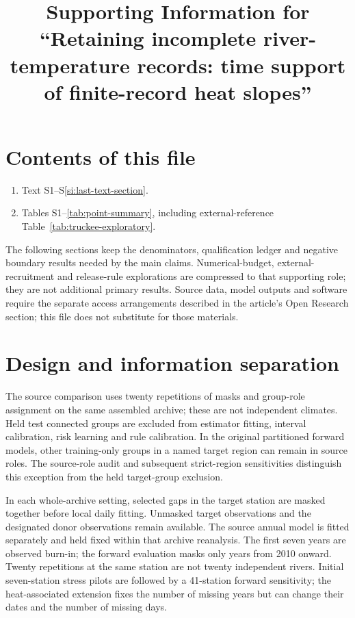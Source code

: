 \documentclass[draft,wrr]{agutexSI2019}
\begin{document}
\title{Supporting Information for ``Retaining incomplete river-temperature records: time support of finite-record heat slopes''}
\begin{article}
\makeatletter
\let\table\savetable
\let\endtable\saveendtable
\let\tabular\savetabular
\let\endtabular\saveendtabular
\let\caption\savecaption
\let\figure\savefigure
\let\endfigure\saveendfigure
\makeatother
\section*{Contents of this file}
\begin{enumerate}
\item Text S1--S\ref{si:last-text-section}.
\item Tables S1--\ref{tab:point-summary}, including external-reference Table~\ref{tab:truckee-exploratory}.
\end{enumerate}
The following sections keep the denominators, qualification ledger and negative boundary results needed by the main claims. Numerical-budget, external-recruitment and release-rule explorations are compressed to that supporting role; they are not additional primary results. Source data, model outputs and software require the separate access arrangements described in the article's Open Research section; this file does not substitute for those materials.

\section{Design and information separation}
The source comparison uses twenty repetitions of masks and group-role assignment on the same assembled archive; these are not independent climates. Held test connected groups are excluded from estimator fitting, interval calibration, risk learning and rule calibration. In the original partitioned forward models, other training-only groups in a named target region can remain in source roles. The source-role audit and subsequent strict-region sensitivities distinguish this exception from the held target-group exclusion.

In each whole-archive setting, selected gaps in the target station are masked together before local daily fitting. Unmasked target observations and the designated donor observations remain available. The source annual model is fitted separately and held fixed within that archive reanalysis. The first seven years are observed burn-in; the forward evaluation masks only years from 2010 onward. Twenty repetitions at the same station are not twenty independent rivers. Initial seven-station stress pilots are followed by a 41-station forward sensitivity; the heat-associated extension fixes the number of missing years but can change their dates and the number of missing days.


\end{article}
\end{document}
